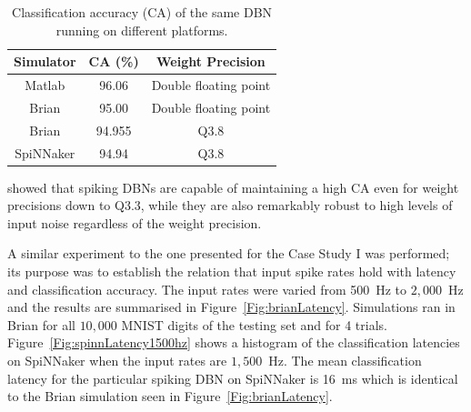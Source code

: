 \begin{table}[h]
\caption{Classification accuracy (CA) of the same DBN running on different platforms.}
\begin{center}
\begin{tabular} {c|c|c}
	Simulator & CA (\%) & Weight Precision \\
    \hline
    Matlab & 96.06 & Double floating point\\
    Brian & 95.00 & Double floating point\\
    Brian & 94.955 & Q3.8\\
    SpiNNaker & 94.94 & Q3.8\\
\end{tabular}
\label{tab:casimulators}
\end{center}
\end{table}


\citet{stromatias2015robustness} showed that spiking DBNs are capable of maintaining a high CA even for weight precisions down to Q3.3, while they are also remarkably robust to high levels of input noise regardless of the weight precision. 


A similar experiment to the one presented for the Case Study I was performed; its purpose was to establish the relation that input spike rates hold with latency and classification accuracy.
The input rates were varied from 500~Hz to $2,000$~Hz and the results are summarised in Figure~\ref{Fig:brianLatency}. Simulations ran in Brian for all $10,000$ MNIST digits of the testing set and for 4 trials. Figure~\ref{Fig:spinnLatency1500hz} shows a histogram of the classification latencies on SpiNNaker when the input rates are $1,500$~Hz. The mean classification latency for the particular spiking DBN on SpiNNaker is 16~ms which is identical to the Brian simulation seen in Figure~\ref{Fig:brianLatency}.


